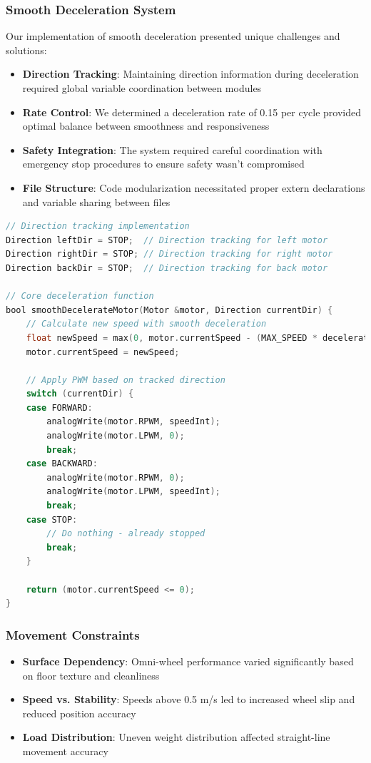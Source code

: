 \documentclass{article}
\begin{document}
\subsubsection{Smooth Deceleration System}
Our implementation of smooth deceleration presented unique challenges and solutions:

\begin{itemize}
    \item \textbf{Direction Tracking}: Maintaining direction information during deceleration required global variable coordination between modules
    \item \textbf{Rate Control}: We determined a deceleration rate of 0.15 per cycle provided optimal balance between smoothness and responsiveness
    \item \textbf{Safety Integration}: The system required careful coordination with emergency stop procedures to ensure safety wasn't compromised
    \item \textbf{File Structure}: Code modularization necessitated proper extern declarations and variable sharing between files
\end{itemize}

\begin{lstlisting}[language=C, basicstyle=\ttfamily\footnotesize, frame=single, xleftmargin=10mm, xrightmargin=10mm]
// Direction tracking implementation
Direction leftDir = STOP;  // Direction tracking for left motor
Direction rightDir = STOP; // Direction tracking for right motor
Direction backDir = STOP;  // Direction tracking for back motor

// Core deceleration function
bool smoothDecelerateMotor(Motor &motor, Direction currentDir) {
    // Calculate new speed with smooth deceleration
    float newSpeed = max(0, motor.currentSpeed - (MAX_SPEED * decelerationRate));
    motor.currentSpeed = newSpeed;
    
    // Apply PWM based on tracked direction
    switch (currentDir) {
    case FORWARD:
        analogWrite(motor.RPWM, speedInt);
        analogWrite(motor.LPWM, 0);
        break;
    case BACKWARD:
        analogWrite(motor.RPWM, 0);
        analogWrite(motor.LPWM, speedInt);
        break;
    case STOP:
        // Do nothing - already stopped
        break;
    }
    
    return (motor.currentSpeed <= 0);
}
\end{lstlisting}

\subsubsection{Movement Constraints}
\begin{itemize}
    \item \textbf{Surface Dependency}: Omni-wheel performance varied significantly based on floor texture and cleanliness
    \item \textbf{Speed vs. Stability}: Speeds above 0.5 m/s led to increased wheel slip and reduced position accuracy
    \item \textbf{Load Distribution}: Uneven weight distribution affected straight-line movement accuracy
\end{itemize}
\end{document}
